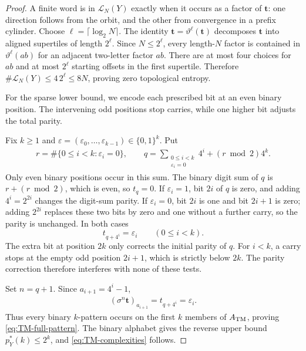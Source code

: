 \documentclass[11pt,reqno]{amsart}
\numberwithin{equation}{section}
\theoremstyle{definition}
\theoremstyle{definition}
\newcommand{\Lcal}{\mathcal L}
\begin{document}
\begin{proof}
A finite word is in $\Lcal_N(Y)$ exactly when it occurs as a factor of
$\mathbf t$: one direction follows from the orbit, and the other from
convergence in a prefix cylinder.  Choose $\ell=\lceil\log_2N\rceil$.  The
identity $\mathbf t=\vartheta^\ell(\mathbf t)$ decomposes $\mathbf t$ into
aligned supertiles of length $2^\ell$.  Since $N\le2^\ell$, every length-$N$
factor is contained in $\vartheta^\ell(ab)$ for an adjacent two-letter factor
$ab$.  There are at most four choices for $ab$ and at most $2^\ell$ starting
offsets in the first supertile.  Therefore
$\#\Lcal_N(Y)\le4\,2^\ell\le8N$, proving zero topological entropy.

For the sparse lower bound, we encode each prescribed bit at an even
binary position. The intervening odd positions stop carries, while
one higher bit adjusts the total parity.

Fix $k\ge1$ and
$\varepsilon=(\varepsilon_0,\ldots,\varepsilon_{k-1})\in\{0,1\}^k$.
Put
\begin{align*}
 r=\#\{0\le i<k:\varepsilon_i=0\},
 \qquad
 q=\sum_{\substack{0\le i<k\\\varepsilon_i=0}}4^i
 +(r\bmod2)4^k.
\end{align*}
Only even binary positions occur in this sum.  The binary digit sum of $q$ is
$r+(r\bmod2)$, which is even, so $t_q=0$.  If $\varepsilon_i=1$, bit $2i$
of $q$ is zero, and adding $4^i=2^{2i}$ changes the digit-sum parity.  If
$\varepsilon_i=0$, bit $2i$ is one and bit $2i+1$ is zero; adding $2^{2i}$
replaces these two bits by zero and one without a further carry, so the parity
is unchanged.  In both cases
\begin{equation}\label{eq:TM-digit-identity}
 t_{q+4^i}=\varepsilon_i\qquad(0\le i<k).
\end{equation}
The extra bit at position $2k$ only corrects the initial parity of $q$.
For $i<k$, a carry stops at the empty odd position $2i+1$, which is
strictly below $2k$. The parity correction therefore interferes with
none of these tests.

Set $n=q+1$. Since $a_{i+1}=4^i-1$,
\begin{align*}
 (\sigma^n\mathbf t)_{a_{i+1}}
 =t_{q+4^i}=\varepsilon_i.
\end{align*}
Thus every binary $k$-pattern occurs on the first $k$ members of
$A_{\rm TM}$, proving \eqref{eq:TM-full-pattern}.  The binary alphabet gives
the reverse upper bound $p_Y^*(k)\le2^k$, and
\eqref{eq:TM-complexities} follows.
\end{proof}
\end{document}
